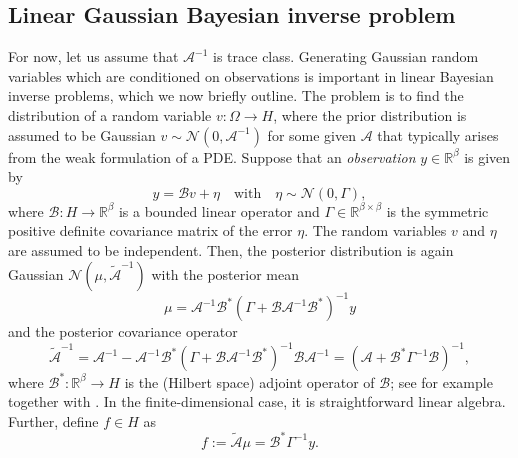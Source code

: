 \documentclass[11pt,english]{article}
\theoremstyle{plain}
\theoremstyle{plain}
\theoremstyle{plain}
\theoremstyle{plain}
\numberwithin{equation}{section}
\newcommand{\rev}[1]{#1}
\newcommand{\jg}[1]{#1}
\begin{document}
\subsection{\rev{Linear Gaussian Bayesian inverse problem}\label{subsec:Linear-Bayesian-inverse}}

For now, let us assume that $\mathcal{A}^{-1}$ is trace class. Generating Gaussian random variables which are conditioned on observations is important in linear Bayesian inverse problems, which we now briefly outline.
The problem is to find the distribution of a random variable $v\colon\Omega\to H$,
where the prior distribution is assumed to be Gaussian $v\sim\mathcal{N}(0,\mathcal{A}^{-1})$ for some given $\mathcal{A}$ that typically arises from the weak formulation of a PDE.
Suppose that an \emph{observation} $y\in\mathbb{R}^{\beta}$ is given
by
\begin{equation}
	y=\mathcal{B}v+\eta\quad\text{with}\quad\eta\sim\mathcal{N}(0,\Gamma),\label{eq:infinitdim-obs}
\end{equation}
where $\mathfrak{\mathcal{B}}\colon H\to\mathbb{R}^{\beta}$ is a
bounded linear operator and $\Gamma\in\mathbb{R}^{\beta\times \beta}$ is
the symmetric positive definite covariance matrix of the error $\eta$. The random variables $v$ and
$\eta$ are assumed to be independent. Then, the posterior distribution
is again Gaussian $\mathcal{N}(\mu,\widetilde{\mathcal{A}}^{-1})$
with the posterior mean
\begin{equation}
	\mu=\mathcal{A}^{-1}\mathcal{B}^{*}(\Gamma+\mathcal{B}\mathcal{A}^{-1}\mathcal{B}^{*})^{-1}y\label{eq:postm-infinite}
\end{equation}
and the posterior covariance operator
\begin{equation}
	\widetilde{\mathcal{A}}^{-1}=\mathcal{A}^{-1}-\mathcal{A}^{-1}\mathcal{B}^{*}(\Gamma+\mathcal{B}\mathcal{A}^{-1}\mathcal{B}^{*})^{-1}\mathcal{B}\mathcal{A}^{-1} = \left(\mathcal{A}+\mathcal{B}^{*}\Gamma^{-1}\mathcal{B}\right)^{-1},\label{eq:postcov-infinite}
\end{equation}
where $\mathcal{B}^{*}\colon\mathbb{R}^{\beta}\to H$ is the (Hilbert
space) adjoint operator of $\mathcal{B}$; see for example \cite[Lemma 4.3]{Hairer.M_etal_2005_AnalysisSPDEsArising}
together with \cite[Chapter
2]{Sullivan.TJ_2015_IntroductionUncertaintyQuantification}. \jg{In the
  finite-dimensional case, it is straightforward linear algebra.} Further, define $f\in H$ as
\begin{equation}
	f := \widetilde{\mathcal{A}}\mu = \mathcal{B}^* \Gamma^{-1} y.\label{eqn:f_definition}
\end{equation}
\end{document}
